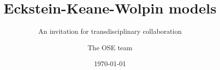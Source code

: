 \title{Eckstein-Keane-Wolpin models}
\subtitle{An invitation for transdisciplinary collaboration}
\author{The OSE team}
\date{\today}

\begin{frame}[standout]{~}\titlepage\end{frame}
